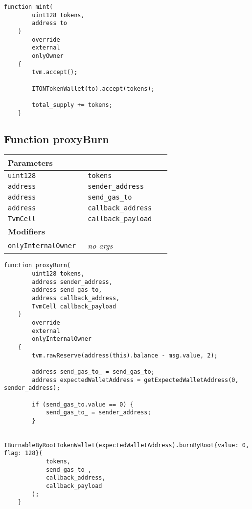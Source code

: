 \vspace{2cm}

\begin{lstlisting}[firstnumber=282]
    function mint(
        uint128 tokens,
        address to
    )
        override
        external
        onlyOwner
    {
        tvm.accept();

        ITONTokenWallet(to).accept(tokens);

        total_supply += tokens;
    }
\end{lstlisting}

\subsection{Function proxyBurn}


\ifsoltables
\noindent\begin{tabular}{|l|l|p{5cm}|}\hline
\multicolumn{3}{|l|}{\bf Parameters}\\\hline
\tt uint128 & \tt tokens &\\\hline
\tt address & \tt sender\_{}address &\\\hline
\tt address & \tt send\_{}gas\_{}to &\\\hline
\tt address & \tt callback\_{}address &\\\hline
\tt TvmCell & \tt callback\_{}payload &\\\hline
\multicolumn{3}{|l|}{\bf Modifiers}\\\hline
\tt onlyInternalOwner & {\em no args} &\\\hline
\end{tabular}
\fi

\vspace{2cm}

\begin{lstlisting}[firstnumber=307]
    function proxyBurn(
        uint128 tokens,
        address sender_address,
        address send_gas_to,
        address callback_address,
        TvmCell callback_payload
    )
        override
        external
        onlyInternalOwner
    {
        tvm.rawReserve(address(this).balance - msg.value, 2);

        address send_gas_to_ = send_gas_to;
        address expectedWalletAddress = getExpectedWalletAddress(0, sender_address);

        if (send_gas_to.value == 0) {
            send_gas_to_ = sender_address;
        }

        IBurnableByRootTokenWallet(expectedWalletAddress).burnByRoot{value: 0, flag: 128}(
            tokens,
            send_gas_to_,
            callback_address,
            callback_payload
        );
    }
\end{lstlisting}

